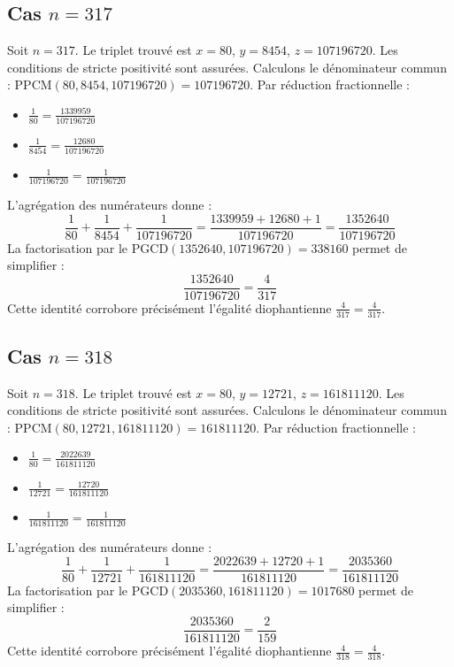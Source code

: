 \documentclass[11pt,a4paper]{article}
\begin{document}
\subsection{Cas $n = 317$}
Soit $n = 317$. Le triplet trouvé est $x = 80$, $y = 8454$, $z = 107196720$.
Les conditions de stricte positivité sont assurées.
Calculons le dénominateur commun : $\text{PPCM}(80, 8454, 107196720) = 107196720$.
Par réduction fractionnelle :
\begin{itemize}
    \item $\frac{1}{80} = \frac{1339959}{107196720}$
    \item $\frac{1}{8454} = \frac{12680}{107196720}$
    \item $\frac{1}{107196720} = \frac{1}{107196720}$
\end{itemize}
L'agrégation des numérateurs donne :
$$ \frac{1}{80} + \frac{1}{8454} + \frac{1}{107196720} = \frac{1339959 + 12680 + 1}{107196720} = \frac{1352640}{107196720} $$
La factorisation par le $\text{PGCD}(1352640, 107196720) = 338160$ permet de simplifier :
$$ \frac{1352640}{107196720} = \frac{4}{317} $$
Cette identité corrobore précisément l'égalité diophantienne $\frac{4}{317} = \frac{4}{317}$.

\subsection{Cas $n = 318$}
Soit $n = 318$. Le triplet trouvé est $x = 80$, $y = 12721$, $z = 161811120$.
Les conditions de stricte positivité sont assurées.
Calculons le dénominateur commun : $\text{PPCM}(80, 12721, 161811120) = 161811120$.
Par réduction fractionnelle :
\begin{itemize}
    \item $\frac{1}{80} = \frac{2022639}{161811120}$
    \item $\frac{1}{12721} = \frac{12720}{161811120}$
    \item $\frac{1}{161811120} = \frac{1}{161811120}$
\end{itemize}
L'agrégation des numérateurs donne :
$$ \frac{1}{80} + \frac{1}{12721} + \frac{1}{161811120} = \frac{2022639 + 12720 + 1}{161811120} = \frac{2035360}{161811120} $$
La factorisation par le $\text{PGCD}(2035360, 161811120) = 1017680$ permet de simplifier :
$$ \frac{2035360}{161811120} = \frac{2}{159} $$
Cette identité corrobore précisément l'égalité diophantienne $\frac{4}{318} = \frac{4}{318}$.
\end{document}
